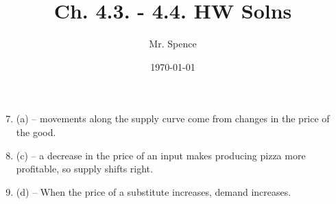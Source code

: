 \documentclass{article}
\title{Ch. 4.3. - 4.4. HW Solns}
\author{Mr. Spence}
\date{\today}
\begin{document}
\maketitle

\begin{enumerate}
\setcounter{enumi}{6}

\item (a) -- movements along the supply curve come from changes in the price of the good.

\item (c) -- a decrease in the price of an input makes producing pizza more profitable, so supply shifts right.

\item (d) -- When the price of a substitute increases, demand increases.

\end{enumerate}
\end{document}
